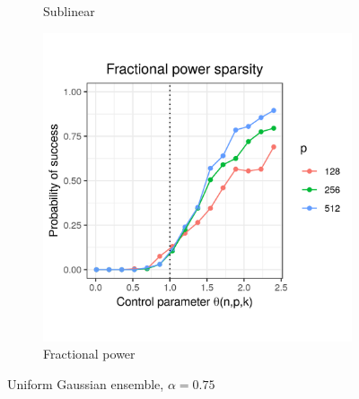 \documentclass{beamer}
\begin{document}
\begin{frame}
\begin{figure}[h]
\begin{subfigure}{0.32\textwidth}
    \caption{Sublinear}
  \end{subfigure}
  \begin{subfigure}{0.32\textwidth}
    \includegraphics[width=0.9\linewidth]{uniform_fractional_power_sparsity_alpha_075}
    \caption{Fractional power}
  \end{subfigure}
  \caption{Uniform Gaussian ensemble, $\alpha = 0.75$}
\end{figure}

\end{frame}
\end{document}

